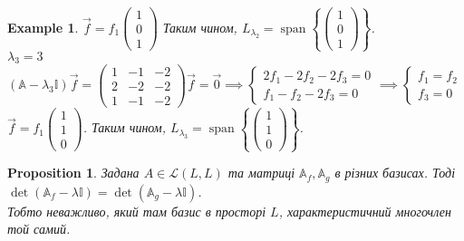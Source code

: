 \documentclass[a4paper, 10pt]{article}
\theoremstyle{theoremdd}
\newtheorem{example}[theorem]{Example}
\newtheorem{proposition}[theorem]{Proposition}
\DeclareMathOperator{\linspan}{span}
\begin{document}
\begin{example}
$\vec{f} = f_1 \begin{pmatrix}
1 \\ 0 \\ 1
\end{pmatrix}$ Таким чином, $L_{\lambda_2} = \linspan\left\{ \begin{pmatrix}
1 \\ 0 \\ 1
\end{pmatrix} \right\}$.
\bigskip \\
$\lambda_3 = 3$\\
$(\mathbb{A} - \lambda_3 \mathbb{I})\vec{f} =\begin{pmatrix}
1 & -1 & -2 \\
2 & -2 & -2 \\
1 & -1 & -2
\end{pmatrix} \vec{f} = \vec{0} \implies \begin{cases} 2f_1 - 2f_2 - 2f_3 = 0 \\ f_1 - f_2 - 2f_3 = 0 \end{cases} \implies \begin{cases} f_1 = f_2 \\ f_3 = 0 \end{cases}$\\
$\vec{f} = f_1 \begin{pmatrix}
1 \\ 1 \\ 0
\end{pmatrix}$. Таким чином, $L_{\lambda_3} = \linspan\left\{ \begin{pmatrix}
1 \\ 1 \\ 0
\end{pmatrix} \right\}$.
\end{example}

\begin{proposition}
\label{change_of_basis_characteristic_polynomial}
Задана $A \in \mathcal{L}(L,L)$ та матриці $\mathbb{A}_f, \mathbb{A}_g$ в різних базисах. Тоді $\det(\mathbb{A}_f - \lambda \mathbb{I}) = \det(\mathbb{A}_g - \lambda \mathbb{I})$.\\
Тобто неважливо, який там базис в просторі $L$, характеристичний многочлен той самий.
\end{proposition}
\end{document}
